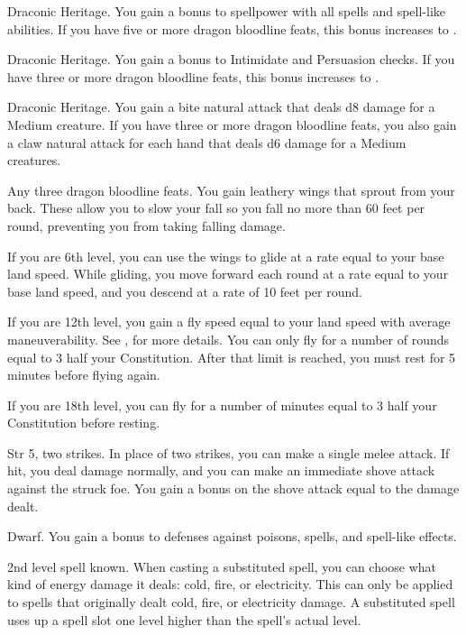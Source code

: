 \featpre Draconic Heritage.
\featben You gain a  bonus to spellpower with all spells and spell-like abilities.
If you have five or more dragon bloodline feats, this bonus increases to .

\featpre Draconic Heritage.
\featben You gain a  bonus to Intimidate and Persuasion checks.
If you have three or more dragon bloodline feats, this bonus increases to .

\featpre Draconic Heritage.
\featben You gain a bite natural attack that deals d8 damage for a Medium creature.
If you have three or more dragon bloodline feats, you also gain a claw natural attack for each hand that deals d6 damage for a Medium creatures.

\featpre Any three dragon bloodline feats.
\featben You gain leathery wings that sprout from your back.
These allow you to slow your fall so you fall no more than 60 feet per round, preventing you from taking falling damage.

If you are 6th level, you can use the wings to glide at a rate equal to your base land speed.
While gliding, you move forward each round at a rate equal to your base land speed, and you descend at a rate of 10 feet per round.

If you are 12th level, you gain a fly speed equal to your land speed with average maneuverability.
See , for more details.
You can only fly for a number of rounds equal to 3 \add half your Constitution.
After that limit is reached, you must rest for 5 minutes before flying again.

If you are 18th level, you can fly for a number of minutes equal to 3 \add half your Constitution before resting.

\featpres Str 5, two strikes.
\featben In place of two strikes, you can make a single melee attack.
If hit, you deal damage normally, and you can make an immediate shove attack against the struck foe.
You gain a bonus on the shove attack equal to the damage dealt.

\featpre Dwarf.
\featben You gain a  bonus to defenses against poisons, spells, and spell-like effects.

\featpre 2nd level spell known.
\featben When casting a substituted spell, you can choose what kind of energy damage it deals: cold, fire, or electricity.
This can only be applied to spells that originally dealt cold, fire, or electricity damage.
A substituted spell uses up a spell slot one level higher than the spell's actual level.

